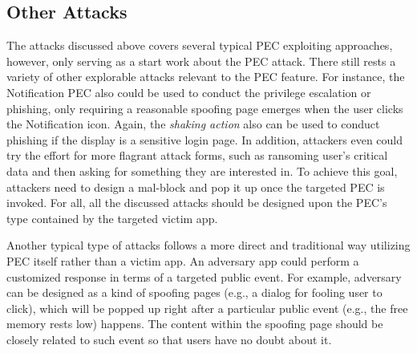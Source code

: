 \subsection{Other Attacks}
The attacks discussed above covers several typical PEC exploiting approaches, however, only serving as a start work about the PEC attack. There still rests a variety of other explorable attacks relevant to the PEC feature. For instance, the Notification PEC also could be used to conduct the privilege escalation or phishing, only requiring a reasonable spoofing page emerges when the user clicks the Notification icon. Again, the \textit{shaking action} also can be used to conduct phishing if the display is a sensitive login page. In addition, attackers even could try the effort for more flagrant attack forms, such as ransoming user's critical data and then asking for something they are interested in. To achieve this goal, attackers need to design a mal-block and pop it up once the targeted PEC is invoked. For all, all the discussed attacks should be designed upon the PEC's type contained by the targeted victim app.

Another typical type of attacks follows a more direct and traditional way utilizing PEC itself rather than a victim app. An adversary app could perform a customized response in terms of a targeted public event. For example, adversary can be designed as a kind of spoofing pages (e.g., a dialog for fooling user to click), which will be popped up right after a particular public event (e.g., the free memory rests low) happens. The content within the spoofing page should be closely related to such event so that users have no doubt about it. 
